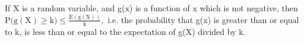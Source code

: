 If X is a random variable, and g(x) is a function of x which is not negative,
then $ \mathrm{P(g(X)} \geq \mathrm{k)} \leq \frac{\mathrm{E(g(X))}}{\mathrm{k}}, $
i.e. the probability that g(x) is greater than or equal to k, is less than or equal
to the expectation of g(X) divided by k.